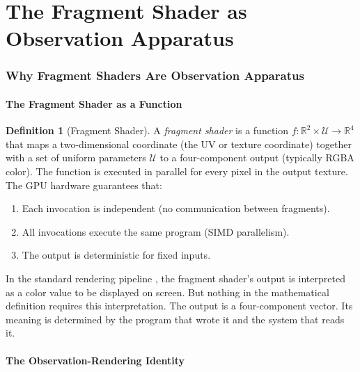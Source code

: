 \documentclass[11pt,twocolumn,a4paper]{article}
\theoremstyle{definition}
\newtheorem{definition}[theorem]{Definition}
\theoremstyle{remark}
\begin{document}
\part{The Fragment Shader as Observation Apparatus}

\section{Why Fragment Shaders Are Observation Apparatus}
\label{sec:shader_observation}

\subsection{The Fragment Shader as a Function}

\begin{definition}[Fragment Shader]
\label{def:fragment_shader}
A \emph{fragment shader} is a function $f: \mathbb{R}^2 \times \mathcal{U} \to \mathbb{R}^4$ that maps a two-dimensional coordinate (the UV or texture coordinate) together with a set of uniform parameters $\mathcal{U}$ to a four-component output (typically RGBA color). The function is executed in parallel for every pixel in the output texture. The GPU hardware guarantees that:
\begin{enumerate}[nosep]
\item Each invocation is independent (no communication between fragments).
\item All invocations execute the same program (SIMD parallelism).
\item The output is deterministic for fixed inputs.
\end{enumerate}
\end{definition}

In the standard rendering pipeline \citep{akenine2018, glsl_es3_spec}, the fragment shader's output is interpreted as a color value to be displayed on screen. But nothing in the mathematical definition requires this interpretation. The output is a four-component vector. Its meaning is determined by the program that wrote it and the system that reads it.

\subsection{The Observation-Rendering Identity}
\end{document}
